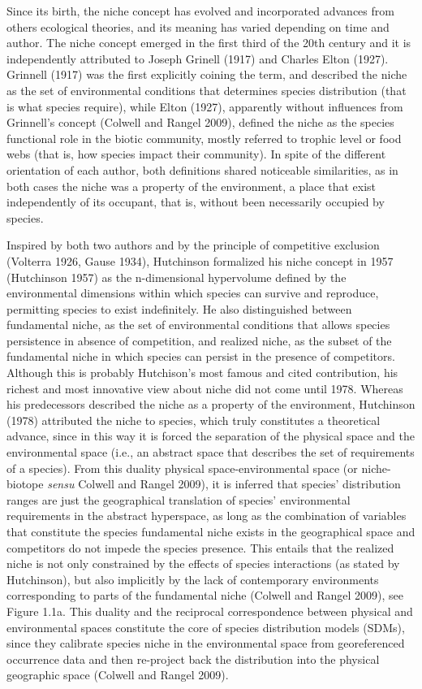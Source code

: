 \documentclass[11pt,twoside]{reedthesis}
\begin{document}
Since its birth, the niche concept has evolved and incorporated advances
from others ecological theories, and its meaning has varied depending on
time and author. The niche concept emerged in the first third of the
20th century and it is independently attributed to Joseph Grinell (1917)
and Charles Elton (1927). Grinnell (1917) was the first explicitly
coining the term, and described the niche as the set of environmental
conditions that determines species distribution (that is what species
require), while Elton (1927), apparently without influences from
Grinnell's concept (Colwell and Rangel 2009), defined the niche as the
species functional role in the biotic community, mostly referred to
trophic level or food webs (that is, how species impact their
community). In spite of the different orientation of each author, both
definitions shared noticeable similarities, as in both cases the niche
was a property of the environment, a place that exist independently of
its occupant, that is, without been necessarily occupied by species.\par

Inspired by both two authors and by the principle of competitive
exclusion (Volterra 1926, Gause 1934), Hutchinson formalized his niche
concept in 1957 (Hutchinson 1957) as the n-dimensional hypervolume
defined by the environmental dimensions within which species can survive
and reproduce, permitting species to exist indefinitely. He also
distinguished between fundamental niche, as the set of environmental
conditions that allows species persistence in absence of competition,
and realized niche, as the subset of the fundamental niche in which
species can persist in the presence of competitors. Although this is
probably Hutchison's most famous and cited contribution, his richest and
most innovative view about niche did not come until 1978. Whereas his
predecessors described the niche as a property of the environment,
Hutchinson (1978) attributed the niche to species, which truly
constitutes a theoretical advance, since in this way it is forced the
separation of the physical space and the environmental space (i.e., an
abstract space that describes the set of requirements of a species).
From this duality physical space-environmental space (or niche-biotope
\emph{sensu} Colwell and Rangel 2009), it is inferred that species'
distribution ranges are just the geographical translation of species'
environmental requirements in the abstract hyperspace, as long as the
combination of variables that constitute the species fundamental niche
exists in the geographical space and competitors do not impede the
species presence. This entails that the realized niche is not only
constrained by the effects of species interactions (as stated by
Hutchinson), but also implicitly by the lack of contemporary
environments corresponding to parts of the fundamental niche (Colwell
and Rangel 2009), see Figure 1.1a. This duality and the reciprocal
correspondence between physical and environmental spaces constitute the
core of species distribution models (SDMs), since they calibrate species
niche in the environmental space from georeferenced occurrence data and
then re-project back the distribution into the physical geographic space
(Colwell and Rangel 2009).\par
\end{document}
